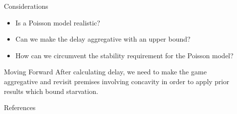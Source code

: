 \documentclass[final]{beamer}
\newlength{\sepwidth}
\newlength{\colwidth}
\newcommand{\separatorcolumn}{\begin{column}{\sepwidth}\end{column}}
\begin{document}
\begin{frame}[t]
\begin{columns}[t]
\begin{column}{\colwidth}
  \begin{exampleblock}{Considerations}
    \begin{itemize}
      \item Is a Poisson model realistic?
      \item Can we make the delay aggregative with an upper bound?
      \item How can we circumvent the stability requirement for the Poisson model?
    \end{itemize}
  \end{exampleblock}
  \vspace{-10mm}

  \begin{block}{Moving Forward}
    After calculating delay, we need to make the game aggregative and revisit
    premises involving concavity in order to apply prior results
    which bound starvation.
  \end{block}

  \begin{block}{References}

    \nocite{*}
    \footnotesize{}

  \end{block}

\end{column}

\separatorcolumn
\end{columns}
\end{frame}
\end{document}
